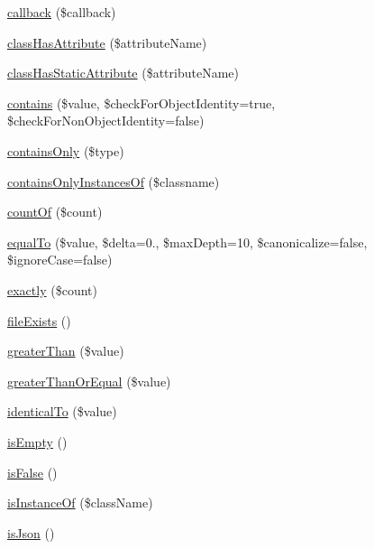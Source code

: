 \begin{DoxyCompactItemize}
\item 
\mbox{\hyperlink{_functions_8php_ae2242eb47799ca6a822b022dc1bd1ac9}{callback}} (\$callback)
\item 
\mbox{\hyperlink{_functions_8php_a695a55a28616dd7c4d9a0aa43b7c41f6}{class\+Has\+Attribute}} (\$attribute\+Name)
\item 
\mbox{\hyperlink{_functions_8php_af21679dfcf7a9d56dbd96b660dda9b52}{class\+Has\+Static\+Attribute}} (\$attribute\+Name)
\item 
\mbox{\hyperlink{_functions_8php_a9dba79f2c57b5f522b794f8c0e029bec}{contains}} (\$value, \$check\+For\+Object\+Identity=true, \$check\+For\+Non\+Object\+Identity=false)
\item 
\mbox{\hyperlink{_functions_8php_a786b8e652e7517ef075f4734b6b5b159}{contains\+Only}} (\$type)
\item 
\mbox{\hyperlink{_functions_8php_a4ec7df260cbfd3cd90a21810031de03d}{contains\+Only\+Instances\+Of}} (\$classname)
\item 
\mbox{\hyperlink{_functions_8php_ac2f7f290c0baf2e861e29a1359d1b613}{count\+Of}} (\$count)
\item 
\mbox{\hyperlink{_functions_8php_a1df4ab1fdc5f4add626f9474b6ae37c7}{equal\+To}} (\$value, \$delta=0., \$max\+Depth=10, \$canonicalize=false, \$ignore\+Case=false)
\item 
\mbox{\hyperlink{_functions_8php_ae7c3745d729abab68ef3f3e783b944cf}{exactly}} (\$count)
\item 
\mbox{\hyperlink{_functions_8php_a7e44544f8ebf95b39ff8530b0fc3f2ea}{file\+Exists}} ()
\item 
\mbox{\hyperlink{_functions_8php_abce6d1e7cbce97c9725bbbcba61afb3a}{greater\+Than}} (\$value)
\item 
\mbox{\hyperlink{_functions_8php_ada4f837a9d31e0594303d561ea82682e}{greater\+Than\+Or\+Equal}} (\$value)
\item 
\mbox{\hyperlink{_functions_8php_a336a6ba8bc724c0227c728093efe2b84}{identical\+To}} (\$value)
\item 
\mbox{\hyperlink{_functions_8php_aedcc52b3673b8df9425e52f13accb2a1}{is\+Empty}} ()
\item 
\mbox{\hyperlink{_functions_8php_ab66d633b29a2651291e004d81f262aa3}{is\+False}} ()
\item 
\mbox{\hyperlink{_functions_8php_af324645a2a21de618d667cabfa622dbd}{is\+Instance\+Of}} (\$class\+Name)
\item 
\mbox{\hyperlink{_functions_8php_a7b5758aea973ef707d377b4eb0a29dee}{is\+Json}} ()
\item 

\end{DoxyCompactItemize}
